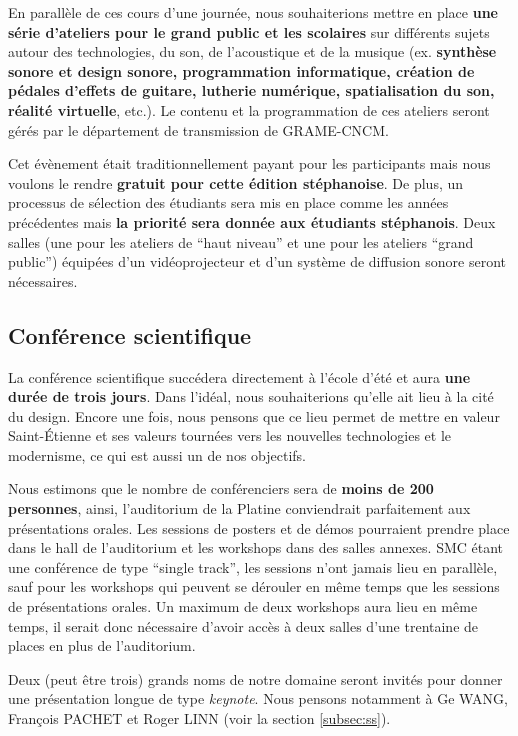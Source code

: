\documentclass[fontsize=12pt]{scrartcl} %
\numberwithin{equation}{section} %
\numberwithin{figure}{section} %
\numberwithin{table}{section} %
\begin{document}
En parallèle de ces cours d'une journée, nous souhaiterions mettre en place \textbf{une série d'ateliers pour le grand public et les scolaires} sur différents sujets autour des technologies, du son, de l'acoustique et de la musique (ex. \textbf{synthèse sonore et design sonore, programmation informatique, création de pédales d'effets de guitare, lutherie numérique, spatialisation du son, réalité virtuelle}, etc.). Le contenu et la programmation de ces ateliers seront gérés par le département de transmission de GRAME-CNCM. 

Cet évènement était traditionnellement payant pour les participants mais nous voulons le rendre \textbf{gratuit pour cette édition stéphanoise}. De plus, un processus de sélection des étudiants sera mis en place comme les années précédentes mais \textbf{la priorité sera donnée aux étudiants stéphanois}. Deux salles (une pour les ateliers de ``haut niveau'' et une pour les ateliers ``grand public'') équipées d'un vidéoprojecteur et d'un système de diffusion sonore seront nécessaires.

\subsection{Conférence scientifique}

La conférence scientifique succédera directement à l'école d'été et aura \textbf{une durée de trois jours}. Dans l'idéal, nous souhaiterions qu'elle ait lieu à la cité du design. Encore une fois, nous pensons que ce lieu permet de mettre en valeur Saint-Étienne et ses valeurs tournées vers les nouvelles technologies et le modernisme, ce qui est aussi un de nos objectifs. 

Nous estimons que le nombre de conférenciers sera de \textbf{moins de 200 personnes}, ainsi, l'auditorium de la Platine conviendrait parfaitement aux présentations orales. Les sessions de posters et de démos pourraient prendre place dans le hall de l'auditorium et les workshops dans des salles annexes. SMC étant une conférence de type ``single track'', les sessions n'ont jamais lieu en parallèle, sauf pour les workshops qui peuvent se dérouler en même temps que les sessions de présentations orales. Un maximum de deux workshops aura lieu en même temps, il serait donc nécessaire d'avoir accès à deux salles d'une trentaine de places en plus de l'auditorium.

Deux (peut être trois) grands noms de notre domaine seront invités pour donner une présentation longue de type \textit{keynote}. Nous pensons notamment à Ge WANG, François PACHET et Roger LINN (voir la section \ref{subsec:ss}).
\end{document}
